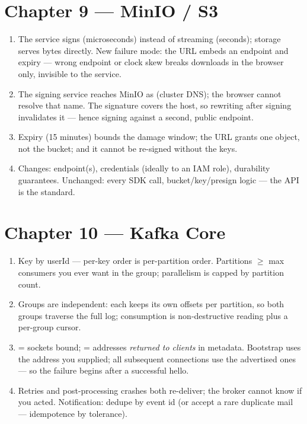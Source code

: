 \section*{Chapter 9 --- MinIO / S3}
\begin{enumerate}
  \item The service signs (microseconds) instead of streaming
  (seconds); storage serves bytes directly. New failure mode: the
  URL embeds an endpoint and expiry --- wrong endpoint or clock skew
  breaks downloads in the browser only, invisible to the service.
  \item The signing service reaches MinIO as 
  (cluster DNS); the browser cannot resolve that name. The signature
  covers the host, so rewriting after signing invalidates it ---
  hence signing against a second, public endpoint.
  \item Expiry (15 minutes) bounds the damage window; the URL grants
  one object, not the bucket; and it cannot be re-signed without the
  keys.
  \item Changes: endpoint(s), credentials (ideally to an IAM role),
  durability guarantees. Unchanged: every SDK call, bucket/key/presign
  logic --- the API is the standard.
\end{enumerate}

\section*{Chapter 10 --- Kafka Core}
\begin{enumerate}
  \item Key by userId --- per-key order is per-partition order.
  Partitions $\geq$ max consumers you ever want in the group;
  parallelism is capped by partition count.
  \item Groups are independent: each keeps its own offsets per
  partition, so both groups traverse the full log; consumption is
  non-destructive reading plus a per-group cursor.
  \item {} = sockets bound; 
  = addresses \emph{returned to clients} in metadata. Bootstrap uses
  the address you supplied; all subsequent connections use the
  advertised ones --- so the failure begins after a successful hello.
  \item Retries and post-processing crashes both re-deliver;
  the broker cannot know if you acted. Notification: dedupe by event
  id (or accept a rare duplicate mail --- idempotence by tolerance).
\end{enumerate}

